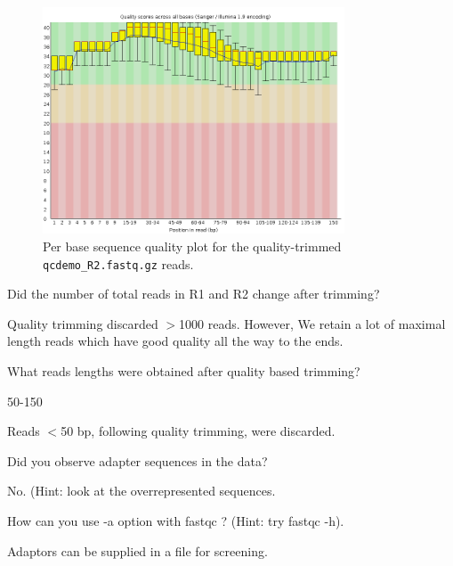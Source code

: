 \begin{steps}
\begin{figure}[H]
\centering
\includegraphics[width=0.8\textwidth]{handout/bad_qcdemo_R2_quality_trimmed.png}
\caption{Per base sequence quality plot for the quality-trimmed \texttt{qcdemo\_R2.fastq.gz} reads.}
\label{fig:bad_example_quality_trimmed_plot}
\end{figure}

\end{steps}

\begin{questions}

Did the number of total reads in R1 and R2 change after trimming?
\begin{answer}
Quality trimming discarded $>$1000 reads. However, We retain a lot of maximal
length reads which have good quality all the way to the ends.
\end{answer}

What reads lengths were obtained after quality based trimming?
\begin{answer}
50-150

Reads $<$50 bp, following quality trimming, were discarded.
\end{answer}

Did you observe adapter sequences in the data?
\begin{answer}
No. (Hint: look at the overrepresented sequences.
\end{answer}

How can you use -a option with fastqc ? (Hint: try fastqc -h).
\begin{answer}
Adaptors can be supplied in a file for screening.
\end{answer}
\end{questions}

